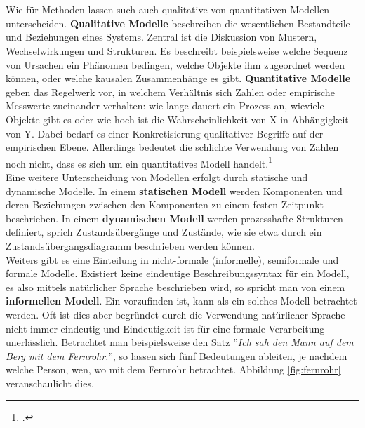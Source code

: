 \documentclass[12pt,a4paper]{article}
\begin{document}
\\
\\
Wie für Methoden lassen such auch qualitative von quantitativen Modellen unterscheiden. \textbf{Qualitative Modelle} beschreiben die wesentlichen Bestandteile und Beziehungen eines Systems. Zentral ist die Diskussion von Mustern, Wechselwirkungen und Strukturen. Es beschreibt beispielsweise welche Sequenz von Ursachen ein Phänomen bedingen, welche Objekte ihm zugeordnet werden können, oder welche kausalen Zusammenhänge es gibt. \textbf{Quantitative Modelle} geben das Regelwerk vor, in welchem Verhältnis sich Zahlen oder empirische Messwerte zueinander verhalten: wie lange dauert ein Prozess an, wieviele Objekte gibt es oder wie hoch ist die Wahrscheinlichkeit von X in Abhängigkeit von Y. Dabei bedarf es einer Konkretisierung qualitativer Begriffe auf der empirischen Ebene. Allerdings bedeutet die schlichte Verwendung von Zahlen noch nicht, dass es sich um ein quantitatives Modell handelt.\footcite[][S.309–329]{wolf1995qualitative}
\\ 
Eine weitere Unterscheidung von Modellen erfolgt durch statische und dynamische Modelle. In einem \textbf{statischen Modell} werden Komponenten und deren Beziehungen zwischen den Komponenten zu einem festen Zeitpunkt beschrieben. In einem \textbf{dynamischen Modell} werden prozesshafte Strukturen definiert, sprich Zustandsübergänge und Zustände, wie sie etwa durch ein Zustandsübergangsdiagramm beschrieben werden können.
\\
Weiters gibt es eine Einteilung in nicht-formale (informelle), semiformale und formale Modelle. Existiert keine eindeutige Beschreibungssyntax für ein Modell, es also mittels natürlicher Sprache beschrieben wird, so spricht man von einem \textbf{informellen Modell}. Ein vorzufinden ist, kann als ein solches Modell betrachtet werden. Oft ist dies aber begründet durch die Verwendung natürlicher Sprache nicht immer eindeutig und Eindeutigkeit ist für eine formale Verarbeitung unerlässlich. Betrachtet man beispielsweise den Satz ''\textit{Ich sah den Mann auf dem Berg mit dem Fernrohr.}'', so lassen sich fünf Bedeutungen ableiten, je nachdem welche Person, wen, wo mit dem Fernrohr betrachtet. Abbildung \ref{fig:fernrohr} veranschaulicht dies.
\end{document}
